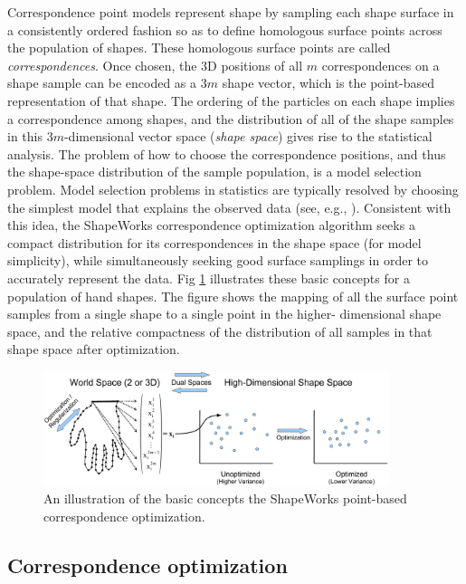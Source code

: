 \documentclass[letterpaper,12pt]{article}   %
\begin{document}
Correspondence point models represent shape by sampling each shape surface in a consistently ordered fashion so as to define homologous surface points across the population of shapes. These homologous surface points are called \textit{correspondences}. Once chosen, the 3D positions of all $m$ correspondences on a shape sample can be encoded as a $3m$ shape vector, which is the point-based representation of that shape. The ordering of the particles on each shape implies a correspondence among shapes, and the distribution of all of the shape samples in this $3m$-dimensional vector space (\textit{shape space}) gives rise to the statistical analysis. The problem of how to choose the correspondence positions, and thus the shape-space distribution of the sample population, is a model selection problem. Model selection problems in statistics are typically resolved by choosing the simplest model that explains the observed data (see, e.g., \cite{hansen2001model}). Consistent with this idea, the ShapeWorks correspondence optimization algorithm seeks a compact distribution for its correspondences in the shape space (for model simplicity), while simultaneously seeking good surface samplings in order to accurately represent the data. Fig \ref{fig:overview} illustrates these basic concepts for a population of hand shapes. The figure shows the mapping of all the surface point samples from a single shape to a single point in the higher- dimensional shape space, and the relative compactness of the distribution of all samples in that shape space after optimization.


\begin{figure}[!htp]
	\centering
	\includegraphics[width=0.9\textwidth]{figs_v2/overview.png}
	\caption{An illustration of the basic concepts the ShapeWorks point-based correspondence optimization.}
	\label{fig:overview}
\end{figure}


\subsection{Correspondence optimization}
\end{document}
